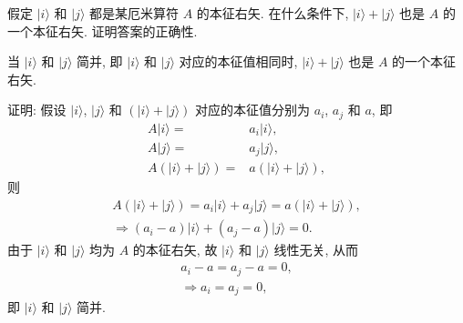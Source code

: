 \documentclass{assignment}
\begin{document}
\begin{prob}[课本习题 1.7]
    假定 $\lvert i\rangle$ 和 $\lvert j\rangle$ 都是某厄米算符 $A$ 的本征右矢. 在什么条件下, $\lvert i\rangle+\lvert j\rangle$ 也是 $A$ 的一个本征右矢. 证明答案的正确性.
\end{prob}
\begin{sol}
    当 $\lvert i\rangle$ 和 $\lvert j\rangle$ 简并, 即 $\lvert i\rangle$ 和 $\lvert j\rangle$ 对应的本征值相同时, $\lvert i\rangle+\lvert j\rangle$ 也是 $A$ 的一个本征右矢.

    证明: 假设 $\lvert i\rangle$, $\lvert j\rangle$ 和 $(\lvert i\rangle+\lvert j\rangle)$ 对应的本征值分别为 $a_i$, $a_j$ 和 $a$, 即
    \begin{align}
        A\lvert i\rangle=&a_i\lvert i\rangle,\\
        A\lvert j\rangle=&a_j\lvert j\rangle,\\
        A(\lvert i\rangle+\lvert j\rangle)=&a(\lvert i\rangle+\lvert j\rangle),
    \end{align}
    则
    \begin{gather}
        A(\lvert i\rangle+\lvert j\rangle)=a_i\lvert i\rangle+a_j\lvert j\rangle=a(\lvert i\rangle+\lvert j\rangle),\\
        \Longrightarrow(a_i-a)\lvert i\rangle+(a_j-a)\lvert j\rangle=0.
    \end{gather}
    由于 $\lvert i\rangle$ 和 $\lvert j\rangle$ 均为 $A$ 的本征右矢, 故 $\lvert i\rangle$ 和 $\lvert j\rangle$ 线性无关, 从而
    \begin{gather}
        a_i-a=a_j-a=0,\\
        \Longrightarrow a_i=a_j=0,
    \end{gather}
    即 $\lvert i\rangle$ 和 $\lvert j\rangle$ 简并.
\end{sol}
\end{document}
